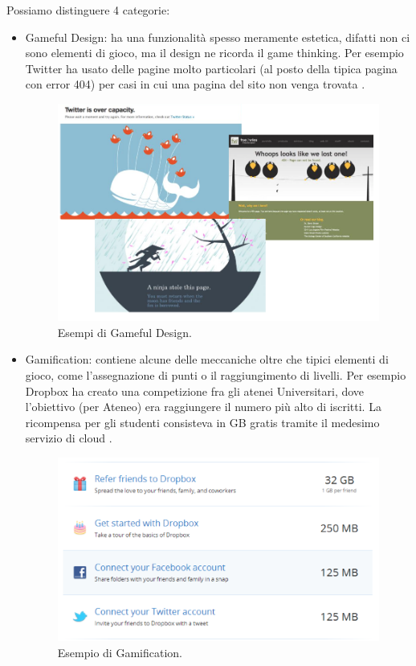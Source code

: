 Possiamo distinguere 4 categorie:

\begin{itemize}
\item Gameful Design: ha una funzionalità spesso meramente estetica, difatti non ci sono elementi di gioco, ma il design ne ricorda il game thinking. Per esempio Twitter ha usato delle pagine molto particolari (al posto della tipica pagina con error 404) per casi in cui una pagina del sito non venga trovata \myfig{\ref{fig:gamefuldesignex}}.

\begin{figure}[h]
\centerline{\includegraphics[scale=0.35]{images/statoarte/gamefuldesignex.png}}
\caption{Esempi di Gameful Design.}
\label{fig:gamefuldesignex}
\end{figure}

\item Gamification: contiene alcune delle meccaniche oltre che tipici elementi di gioco, come l'assegnazione di punti o il raggiungimento di livelli. Per esempio Dropbox ha creato una competizione fra gli atenei Universitari, dove l'obiettivo (per Ateneo) era raggiungere il numero più alto di iscritti. La ricompensa per gli studenti consisteva in GB gratis tramite il medesimo servizio di cloud \myfig{\ref{fig:gamefuldesignex}}.

\begin{figure}[b]
\centerline{\includegraphics[scale=0.3]{images/statoarte/gamificationex.png}}
\caption{Esempio di Gamification.}
\label{fig:gamificationex}
\end{figure}


\end{itemize}
